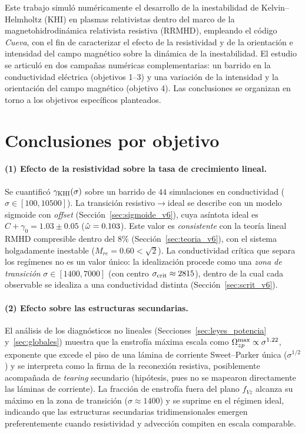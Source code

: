 
\primerparrafo Este trabajo simuló numéricamente el desarrollo de la inestabilidad de Kelvin--Helmholtz (KHI) en plasmas relativistas dentro del marco de la magnetohidrodinámica relativista resistiva (RRMHD), empleando el código \textit{Cueva}, con el fin de caracterizar el efecto de la resistividad y de la orientación e intensidad del campo magnético sobre la dinámica de la inestabilidad. El estudio se articuló en dos campañas numéricas complementarias: un barrido en la conductividad eléctrica (objetivos 1--3) y una variación de la intensidad y la orientación del campo magnético (objetivo 4). Las conclusiones se organizan en torno a los objetivos específicos planteados.

\section{Conclusiones por objetivo}

\paragraph{(1) Efecto de la resistividad sobre la tasa de crecimiento lineal.}
Se cuantificó $\gamma_{\mathrm{KHI}}(\sigma)$ sobre un barrido de $44$ simulaciones en conductividad ($\sigma\in[100,10500]$). La transición resistivo$\to$ideal se describe con un modelo sigmoide con \emph{offset} (Sección~\ref{sec:sigmoide_v6}), cuya asíntota ideal es $C+\gamma_0=1.03\pm0.05$ ($\hat{\omega}=0.103$). Este valor es \emph{consistente} con la teoría lineal RMHD compresible dentro del $8\%$ (Sección~\ref{sec:teoria_v6}), con el sistema holgadamente inestable ($M_{re}=0.60<\sqrt2$). La conductividad crítica que separa los regímenes no es un valor único: la idealización procede como una \emph{zona de transición} $\sigma\in[1400,7000]$ (con centro $\sigma_{\mathrm{crit}}\approx2815$), dentro de la cual cada observable se idealiza a una conductividad distinta (Sección~\ref{sec:scrit_v6}).

\paragraph{(2) Efecto sobre las estructuras secundarias.}
El análisis de los diagnósticos no lineales (Secciones~\ref{sec:leyes_potencia} y~\ref{sec:globales}) muestra que la enstrofía máxima escala como $\Omega_{zp}^{\max}\propto\sigma^{1.22}$, exponente que excede el piso de una lámina de corriente Sweet--Parker única ($\sigma^{1/2}$) y se interpreta como la firma de la reconexión resistiva, posiblemente acompañada de \emph{tearing} secundario (hipótesis, pues no se mapearon directamente las láminas de corriente). La fracción de enstrofía fuera del plano $f_{Vz}$ alcanza su máximo en la zona de transición ($\sigma\approx1400$) y se suprime en el régimen ideal, indicando que las estructuras secundarias tridimensionales emergen preferentemente cuando resistividad y advección compiten en escala comparable.

